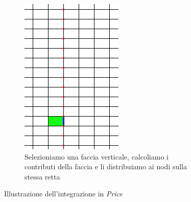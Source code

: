 \documentclass[a4paper,10pt]{report}
\theoremstyle{plain}
\theoremstyle{definition}
\theoremstyle{remark}
\begin{document}
\begin{figure}[p]
\begin{subfigure}[t]{.48\linewidth}
 \includegraphics[width=.85\linewidth]{img/Integrating_on_y}
 \caption{Selezioniamo una faccia verticale, calcoliamo i contributi della faccia e li distribuiamo ai nodi sulla stessa retta}
 \label{fig:integrating_y}
 \vspace{4ex}
 \end{subfigure}
 \caption{Illustrazione dell'integrazione in \emph{Price}}
 \label{fig:dummy}
\end{figure}
\end{document}
